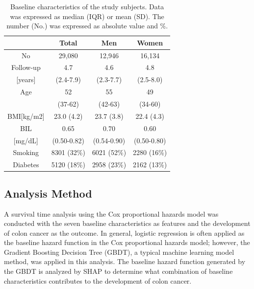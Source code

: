 \documentclass[nohyperref]{article}
\theoremstyle{plain}
\theoremstyle{definition}
\theoremstyle{remark}
\begin{document}
\begin{table}[t]
\caption{Baseline characteristics of the study subjects. Data was expressed as median (IQR) or mean (SD). The number (No.) was expressed as absolute value and \%.}
\label{baseline}
\vskip 0.15in
\begin{center}
\begin{small}
\begin{sc}
\begin{tabular}{c|ccc}
\toprule
 & Total & Men & Women \\
\midrule
No & 29,080 & 12,946 & 16,134 \\ \hline
Follow-up & 4.7 & 4.6 & 4.8 \\
{}[years] & (2.4-7.9) & (2.3-7.7) & (2.5-8.0) \\ \hline
Age & 52 & 55 & 49 \\
 & (37-62) & (42-63) & (34-60) \\ \hline
BMI[kg/m2] & 23.0 (4.2) & 23.7 (3.8) & 22.4 (4.3) \\ \hline
BIL & 0.65 & 0.70 & 0.60 \\
{}[mg/dL] & (0.50-0.82) & (0.54-0.90) & (0.50-0.80) \\ \hline
Smoking & 8301 (32\%) & 6021 (52\%) & 2280 (16\%) \\ \hline
Diabetes & 5120 (18\%) & 2958 (23\%) & 2162 (13\%) \\
\bottomrule
\end{tabular}
\end{sc}
\end{small}
\end{center}
\vskip -0.1in
\end{table}

\subsection{Analysis Method}
A survival time analysis using the Cox proportional hazards model was conducted with the seven baseline characteristics as features and the development of colon cancer as the outcome.
In general, logistic regression is often applied as the baseline hazard function in the Cox proportional hazards model; however, the Gradient Boosting Decision Tree (GBDT), a typical machine learning model method, was applied in this analysis.
The baseline hazard function generated by the GBDT is analyzed by SHAP to determine what combination of baseline characteristics contributes to the development of colon cancer.
\end{document}
